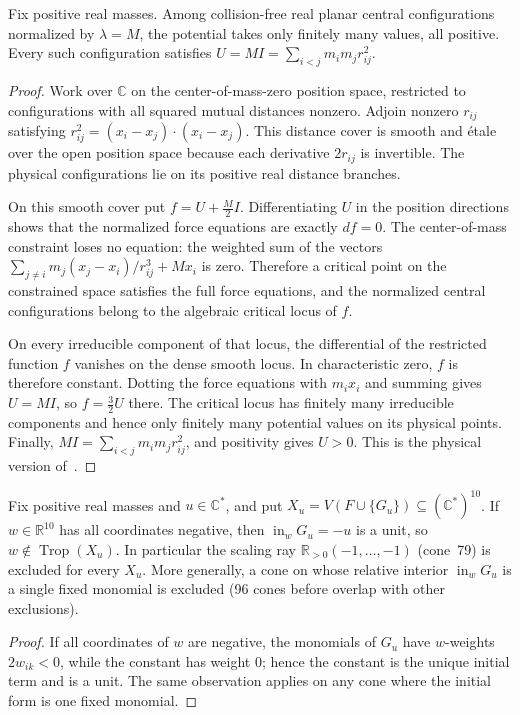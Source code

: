 \documentclass[11pt]{amsart}
\theoremstyle{definition}\newtheorem{definition}[theorem]{Definition}\theoremstyle{remark}\newtheorem{remark}[theorem]{Remark}
\newcommand{\Trop}{\operatorname{Trop}}\newcommand{\inn}{\operatorname{in}}\newcommand{\Q}{\mathbb{Q}}
\begin{document}
\begin{lemma}\label{lem:U}
Fix positive real masses. Among collision-free real planar central configurations normalized by $\lambda=M$, the potential takes only finitely many values, all positive. Every such configuration satisfies $U=MI=\sum_{i<j}m_im_jr_{ij}^2$.
\end{lemma}
\begin{proof}
Work over $\mathbb C$ on the center-of-mass-zero position space, restricted to configurations with all squared mutual distances nonzero. Adjoin nonzero $r_{ij}$ satisfying
$r_{ij}^2=(x_i-x_j)\cdot(x_i-x_j)$. This distance cover is smooth and \'etale over the open position space because each derivative $2r_{ij}$ is invertible. The physical configurations lie on its positive real distance branches.

On this smooth cover put $f=U+\frac M2 I$. Differentiating $U$ in the position directions shows that the normalized force equations are exactly $df=0$. The center-of-mass constraint loses no equation: the weighted sum of the vectors $\sum_{j\ne i}m_j(x_j-x_i)/r_{ij}^3+Mx_i$ is zero. Therefore a critical point on the constrained space satisfies the full force equations, and the normalized central configurations belong to the algebraic critical locus of $f$.

On every irreducible component of that locus, the differential of the restricted function $f$ vanishes on the dense smooth locus. In characteristic zero, $f$ is therefore constant. Dotting the force equations with $m_ix_i$ and summing gives $U=MI$, so $f=\frac32U$ there. The critical locus has finitely many irreducible components and hence only finitely many potential values on its physical points. Finally, $MI=\sum_{i<j}m_im_jr_{ij}^2$, and positivity gives $U>0$. This is the physical version of~\citep[Lemma~2]{AK}.
\end{proof}

\begin{lemma}\label{lem:scal}
Fix positive real masses and $u\in\mathbb{C}^*$, and put $X_u=V(F\cup\{G_u\})\subseteq(\mathbb{C}^*)^{10}$. If $w\in\mathbb{R}^{10}$ has all coordinates negative,
then $\operatorname{in}_w G_u=-u$ is a unit, so $w\notin\Trop(X_u)$. In particular the scaling ray $\mathbb{R}_{>0}(-1,\dots,-1)$ (cone~79) is excluded
for every $X_u$. More generally, a cone on whose relative interior $\operatorname{in}_wG_u$ is a single fixed monomial is excluded (96 cones before overlap with other exclusions).
\end{lemma}
\begin{proof}
If all coordinates of $w$ are negative, the monomials of $G_u$ have $w$-weights $2w_{ik}<0$, while the constant has weight $0$; hence the constant is the unique initial term and is a unit. The same observation applies on any cone where the initial form is one fixed monomial.
\end{proof}
\end{document}
